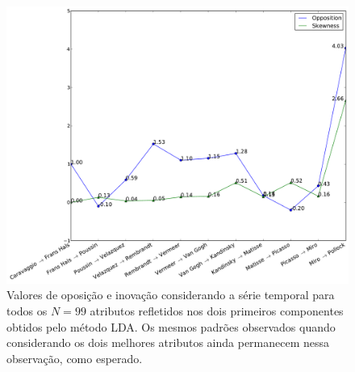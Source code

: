 \begin{figure}[h!]
\begin{center}
        \includegraphics[width=\columnwidth]{figs/caso3_oposEinov}
      \caption{Valores de oposição e inovação considerando a série temporal para
        todos os $N = 99$ atributos refletidos nos dois primeiros componentes
        obtidos pelo método LDA. Os mesmos padrões observados quando
        considerando os dois melhores atributos ainda permanecem nessa
        observação, como esperado.}
        \label{fig:caso3_oposEinov}
\end{center}
\end{figure}

